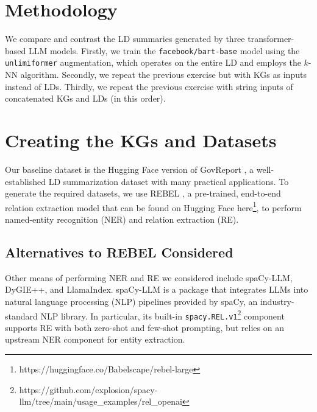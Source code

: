 \documentclass[12pt]{article}
\begin{document}


\section{Methodology}
We compare and contrast the LD summaries generated by three transformer-based LLM models. Firstly, we train the \texttt{facebook/bart-base} model using the \texttt{unlimiformer} augmentation, which operates on the entire LD and employs the $k$-NN algorithm. Secondly, we repeat the previous exercise but with KGs as inputs instead of LDs. Thirdly, we repeat the previous exercise with string inputs of concatenated KGs and LDs (in this order).


\section{Creating the KGs and Datasets}
Our baseline dataset is the Hugging Face version of GovReport \cite{huang2021efficient}, a well-established LD summarization dataset with many practical applications. To generate the required datasets, we use REBEL \cite{huguet2021rebel}, a pre-trained, end-to-end relation extraction model that can be found on Hugging Face here\footnote{https://huggingface.co/Babelscape/rebel-large}, to perform named-entity recognition (NER) and relation extraction (RE).








\subsection*{Alternatives to REBEL Considered}
Other means of performing NER and RE we considered include spaCy-LLM, DyGIE++, and LlamaIndex. spaCy-LLM is a package that integrates LLMs into natural language processing (NLP) pipelines provided by spaCy, an industry-standard NLP library. In particular, its built-in \texttt{spacy.REL.v1}\footnote{https://github.com/explosion/spacy-llm/tree/main/usage\_examples/rel\_openai} component supports RE with both zero-shot and few-shot prompting, but relies on an upstream NER component for entity extraction.
\end{document}
